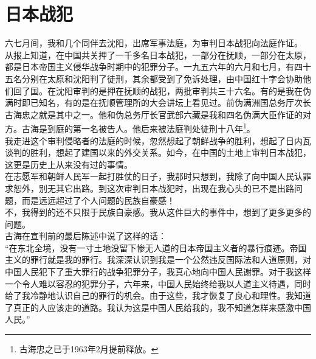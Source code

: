 \fancyhead[RO]{} %
\fancyhead[LE]{} %
\chapter*{日本战犯}
\thispagestyle{empty}
六七月间，我和几个同伴去沈阳，出席军事法庭，为审判日本战犯向法庭作证。\\

从报上知道，在中国共关押了一千多名日本战犯，一部分在抚顺，一部分在太原，都是日本帝国主义侵华战争时期中的犯罪分子。一九五六年的六月和七月，有四十五名分别在太原和沈阳判了徒刑，其余都受到了免诉处理，由中国红十字会协助他们回了国。在沈阳审判的是押在抚顺的战犯，两批审判共三十六名。有的是我在伪满时即已知名，有的是在抚顺管理所的大会讲坛上看见过。前伪满洲国总务厅次长古海忠之就是其中之一。他和伪总务厅长官武部六藏是我和四名伪满大臣作证的对方。古海是到庭的第一名被告人。他后来被法庭判处徒刑十八年\footnote{古海忠之已于1963年2月提前释放。}。\\

我走进这个审判侵略者的法庭的时候，忽然想起了朝鲜战争的胜利，想起了日内瓦谈判的胜利，想起了建国以来的外交关系。如今，在中国的土地上审判日本战犯，这更是历史上从来没有过的事情。\\

在志愿军和朝鲜人民军一起打胜仗的日子，我那时只想到，我除了向中国人民认罪求恕外，别无其它出路。到这次审判日本战犯时，出现在我心头的已不是出路问题，而是远远超过了个人问题的民族自豪感！\\

不，我得到的还不只限于民族自豪感。我从这件巨大的事件中，想到了更多更多的问题。\\

古海在宣判前的最后陈述中说了这样的话：\\

“在东北全境，没有一寸土地没留下惨无人道的日本帝国主义者的暴行痕迹。帝国主义的罪行就是我的罪行。我深深认识到我是一个公然违反国际法和人道原则，对中国人民犯下了重大罪行的战争犯罪分子，我真心地向中国人民谢罪。对于我这样一个令人难以容忍的犯罪分子，六年来，中国人民始终给我以人道主义待遇，同时给了我冷静地认识自己的罪行的机会。由于这些，我才恢复了良心和理性。我知道了真正的人应该走的道路。我认为这是中国人民给我的，我不知道怎样来感激中国人民。”\\

